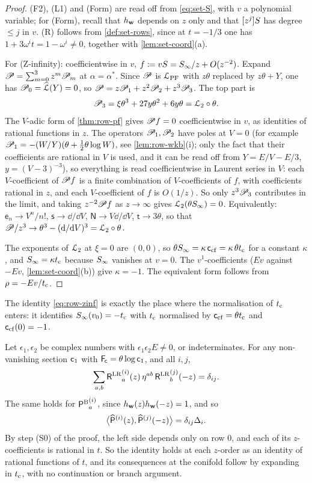 \begin{proof}
(F2), (L1) and (Form) are read off from \eqref{eq:set-S}, with $v$ a polynomial variable; for (Form), recall that $h_{\mathbf{w}}$ depends on $z$ only and that $[z^j]S$ has degree $\leq j$ in $v$. (R) follows from \cref{def:set-rows}, since at $t=-1/3$ one has $1+3\omega^it=1-\omega^i\neq0$, together with \cref{lem:set-coord}(a).

For (Z-infinity): coefficientwise in $v$, $f\coloneqq vS=S_{\infty}/z+O(z^{-2})$. Expand $\mathscr{P}=\sum_{m=0}^{3}z^m\mathscr{P}_m$ at $\alpha=\alpha^*$. Since $\mathscr{P}$ is $\mathcal{L}_{\mathrm{PF}}$ with $z\theta$ replaced by $z\theta+Y$, one has $\mathscr{P}_0=\widehat{\mathcal{L}}(Y)=0$, so $\mathscr{P}=z\mathscr{P}_1+z^2\mathscr{P}_2+z^3\mathscr{P}_3$. The top part is
\[
\mathscr{P}_3=\xi\theta^3+27y\theta^2+6y\theta=\mathcal{L}_{2}\circ\theta.
\]
The $V$-adic form of \cref{thm:row-pf} gives $\mathscr{P} f=0$ coefficientwise in $v$, as identities of rational functions in $z$. The operators $\mathscr{P}_1,\mathscr{P}_2$ have poles at $V=0$ (for example $\mathscr{P}_1=-(W/Y)(\theta+\frac12\theta\log W)$, see \cref{lem:row-wkb}(i); only the fact that their coefficients are rational in $V$ is used, and it can be read off from $Y=E/V-E/3$, $y=(V-3)^{-3}$), so everything is read coefficientwise in Laurent series in $V$: each $V$-coefficient of $\mathscr{P} f$ is a finite combination of $V$-coefficients of $f$, with coefficients rational in $z$, and each $V$-coefficient of $f$ is $O(1/z)$. So only $z^3\mathscr{P}_3$ contributes in the limit, and taking $z^{-2}\mathscr{P} f$ as $z\to\infty$ gives $\mathcal{L}_{2}(\theta S_{\infty})=0$. Equivalently: $\mathsf{e}_n\to V^n/n!$, $\mathsf{s}\to\dd/\dd V$, $\mathsf{N}\to V\dd/\dd V$, $\mathsf{t}\to3\theta$, so that $\mathscr{P}/z^3\to\theta^3-(\mathrm{d}/\mathrm{d} V)^3=\mathcal{L}_{2}\circ\theta$.

The exponents of $\mathcal{L}_{2}$ at $\xi=0$ are $(0,0)$, so $\theta S_{\infty}=\kappa\,\mathsf{c}_{\mathrm{cf}}=\kappa\,\theta t_{\mathrm{c}}$ for a constant $\kappa$, and $S_{\infty}=\kappa t_{\mathrm{c}}$ because $S_{\infty}$ vanishes at $v=0$. The $v^1$-coefficients ($Ev$ against $-Ev$, \cref{lem:set-coord}(b)) give $\kappa=-1$. The equivalent form follows from $\rho=-Ev/t_{\mathrm{c}}$.
\end{proof}

The identity \eqref{eq:row-zinf} is exactly the place where the normalisation of $t_{\mathrm{c}}$ enters: it identifies $S_{\infty}(v_0)=-t_{\mathrm{c}}$ with $t_{\mathrm{c}}$ normalised by $\mathsf{c}_{\mathrm{cf}}=\theta t_{\mathrm{c}}$ and $\mathsf{c}_{\mathrm{cf}}(0)=-1$.

\begin{prop}[Symplecticity]
\label{prop:row-sympl}
Let $\epsilon_1,\epsilon_2$ be complex numbers with $\epsilon_1\epsilon_2E\neq0$, or indeterminates. For any non-vanishing section $\mathsf{c}_{1}$ with $\mathsf{F}_{\!\mathsf{c}}=\theta\log\mathsf{c}_{1}$, and all $i,j$,
\[
\sum_{a,b}{\mathsf{R}^{\mathrm{LR}}}_a^{(i)}(z)\,\eta^{ab}\,{\mathsf{R}^{\mathrm{LR}}}_b^{(j)}(-z)=\delta_{ij}.
\]
The same holds for ${\mathsf{P}^{\mathrm{B}}}_a^{(i)}$, since $h_{\mathbf{w}}(z)h_{\mathbf{w}}(-z)=1$, and so
\[
\big\langle\widehat{\mathsf{P}}^{(i)}(z),\widehat{\mathsf{P}}^{(j)}(-z)\big\rangle=\delta_{ij}\Delta_i.
\]
By step \textup{(S0)} of the proof, the left side depends only on row $0$, and each of its $z$-coefficients is rational in $t$. So the identity holds at each $z$-order as an identity of rational functions of $t$, and its consequences at the conifold follow by expanding in $t_{\mathrm{c}}$, with no continuation or branch argument.
\end{prop}

